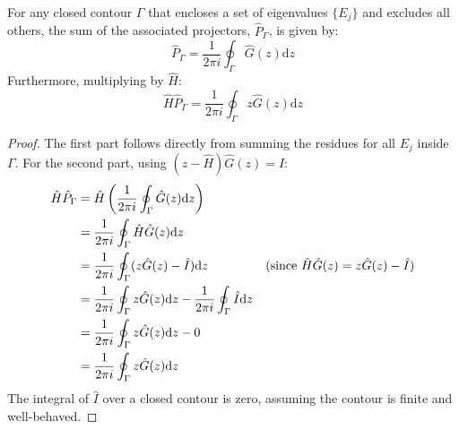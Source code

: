 \begin{theorem}
    For any closed contour $\Gamma$ that encloses a set of
    eigenvalues $\{E_j\}$ and excludes all
    others, the sum of the associated projectors, $\hat P_\Gamma$, is given by:
    \begin{equation} \label{eq:projector_contour_integral}
        \hat P_\Gamma=\frac{1}{2\pi i}\oint_{\Gamma} \hat G(z)\mathrm dz
    \end{equation}
    Furthermore, multiplying by $\hat H$:
    \begin{equation} \label{eq:H_projector_contour_integral}
        \hat H \hat P_\Gamma= \frac{1}{2\pi i}\oint_{\Gamma} z\hat
        G(z)\mathrm dz
    \end{equation}
\end{theorem}
\begin{proof}
    The first part follows directly from summing the residues for all
    $E_j$ inside $\Gamma$.
    For the second part, using $(z-\hat H)\hat G(z) = \hat I$:
    \begin{align}
        \hat H \hat P_\Gamma &= \hat H \left(\frac{1}{2\pi
        i}\oint_{\Gamma} \hat G(z)\mathrm dz\right) \\
        &= \frac{1}{2\pi i}\oint_{\Gamma} \hat H \hat G(z)\mathrm dz \notag \\
        &= \frac{1}{2\pi i}\oint_{\Gamma} (z\hat G(z) - \hat
        I)\mathrm dz \quad &\text{(since } \hat H \hat G(z) = z\hat
        G(z) - \hat I \text{)} \notag \\
        &= \frac{1}{2\pi i}\oint_{\Gamma} z\hat G(z)\mathrm dz -
        \frac{1}{2\pi i}\oint_{\Gamma} \hat I \mathrm dz \notag \\
        &= \frac{1}{2\pi i}\oint_{\Gamma} z\hat G(z)\mathrm dz - 0 \notag \\
        &= \frac{1}{2\pi i}\oint_{\Gamma} z\hat G(z)\mathrm dz \notag
    \end{align}
    The integral of $\hat I$ over a closed contour is zero, assuming
    the contour is finite and well-behaved.
\end{proof}

